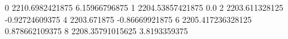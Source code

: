 0 2210.6982421875 6.15966796875
1 2204.53857421875 0.0
2 2203.611328125 -0.92724609375
4 2203.671875 -0.86669921875
6 2205.417236328125 0.878662109375
8 2208.35791015625 3.8193359375
